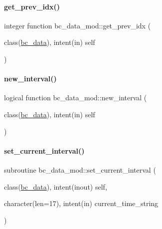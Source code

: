 \paragraph{\texorpdfstring{get\+\_\+prev\+\_\+idx()}{get\_prev\_idx()}}
{\footnotesize\ttfamily integer function bc\+\_\+data\+\_\+mod\+::get\+\_\+prev\+\_\+idx (\begin{DoxyParamCaption}\item[{class(\mbox{\hyperlink{structbc__data__mod_1_1bc__data}{bc\+\_\+data}}), intent(in)}]{self }\end{DoxyParamCaption})\hspace{0.3cm}{\ttfamily [private]}}

\mbox{\label{namespacebc__data__mod_a5f135663819ff90c7e82aa3859ecf596}} 
\paragraph{\texorpdfstring{new\+\_\+interval()}{new\_interval()}}
{\footnotesize\ttfamily logical function bc\+\_\+data\+\_\+mod\+::new\+\_\+interval (\begin{DoxyParamCaption}\item[{class(\mbox{\hyperlink{structbc__data__mod_1_1bc__data}{bc\+\_\+data}}), intent(in)}]{self }\end{DoxyParamCaption})\hspace{0.3cm}{\ttfamily [private]}}

\mbox{\label{namespacebc__data__mod_a6876514f79a3238bb950413ab9e19af7}} 
\paragraph{\texorpdfstring{set\+\_\+current\+\_\+interval()}{set\_current\_interval()}}
{\footnotesize\ttfamily subroutine bc\+\_\+data\+\_\+mod\+::set\+\_\+current\+\_\+interval (\begin{DoxyParamCaption}\item[{class(\mbox{\hyperlink{structbc__data__mod_1_1bc__data}{bc\+\_\+data}}), intent(inout)}]{self,  }\item[{character(len=17), intent(in)}]{current\+\_\+time\+\_\+string }\end{DoxyParamCaption})\hspace{0.3cm}{\ttfamily [private]}}

